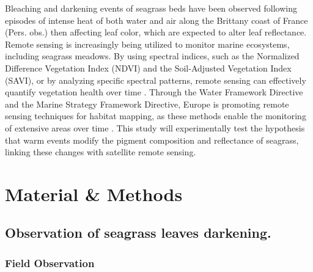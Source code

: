 \documentclass[
  number]{elsarticle}
\begin{document}
Bleaching and darkening events of seagrass beds have been observed
following episodes of intense heat of both water and air along the
Brittany coast of France (Pers. obs.) then affecting leaf color, which
are expected to alter leaf reflectance. Remote sensing is increasingly
being utilized to monitor marine ecosystems, including seagrass meadows.
By using spectral indices, such as the Normalized Difference Vegetation
Index (NDVI) and the Soil-Adjusted Vegetation Index (SAVI), or by
analyzing specific spectral patterns, remote sensing can effectively
quantify vegetation health over time
\citep{huete2012vegetation, kloos2021agricultural, carlan2020identifying, akbar2020mangrove}.
Through the Water Framework Directive and the Marine Strategy Framework
Directive, Europe is promoting remote sensing techniques for habitat
mapping, as these methods enable the monitoring of extensive areas over
time \citep{papathanasopoulou2019satellite}. This study will
experimentally test the hypothesis that warm events modify the pigment
composition and reflectance of seagrass, linking these changes with
satellite remote sensing.

\section{Material \& Methods}\label{material-methods}

\subsection{Observation of seagrass leaves
darkening.}\label{observation-of-seagrass-leaves-darkening.}

\subsubsection{Field Observation}\label{field-observation}
\end{document}
